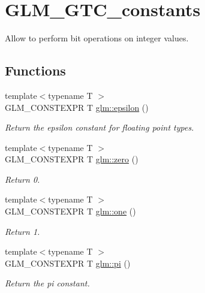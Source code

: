 \hypertarget{group__gtc__constants}{\section{G\-L\-M\-\_\-\-G\-T\-C\-\_\-constants}
\label{group__gtc__constants}
}


Allow to perform bit operations on integer values.  


\subsection*{Functions}
\begin{DoxyCompactItemize}
\item 
{\footnotesize template$<$typename T $>$ }\\G\-L\-M\-\_\-\-C\-O\-N\-S\-T\-E\-X\-P\-R T \hyperlink{group__gtc__constants_ga2b53267cfa3c8aa96c02cdba04c53ef5}{glm\-::epsilon} ()
\begin{DoxyCompactList}\small\item\em Return the epsilon constant for floating point types. \end{DoxyCompactList}\item 
{\footnotesize template$<$typename T $>$ }\\G\-L\-M\-\_\-\-C\-O\-N\-S\-T\-E\-X\-P\-R T \hyperlink{group__gtc__constants_ga1ece9de415050c52a6e2aa5d70a20972}{glm\-::zero} ()
\begin{DoxyCompactList}\small\item\em Return 0. \end{DoxyCompactList}\item 
{\footnotesize template$<$typename T $>$ }\\G\-L\-M\-\_\-\-C\-O\-N\-S\-T\-E\-X\-P\-R T \hyperlink{group__gtc__constants_ga4b7505757b062b9f689d618e5790ce0a}{glm\-::one} ()
\begin{DoxyCompactList}\small\item\em Return 1. \end{DoxyCompactList}\item 
{\footnotesize template$<$typename T $>$ }\\G\-L\-M\-\_\-\-C\-O\-N\-S\-T\-E\-X\-P\-R T \hyperlink{group__gtc__constants_ga12be4efe2470ebe86e7163aefe4a545e}{glm\-::pi} ()
\begin{DoxyCompactList}\small\item\em Return the pi constant. \end{DoxyCompactList}\item 

\end{DoxyCompactItemize}
